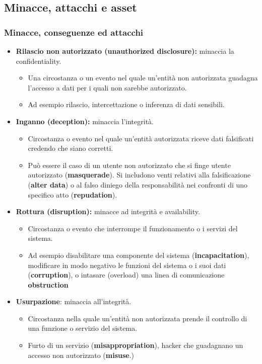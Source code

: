 \documentclass[12pt]{article}
\begin{document}
		\subsection{Minacce, attacchi e asset}
			\subsubsection{Minacce, conseguenze ed attacchi}
				\begin{itemize}
					\item \textbf{Rilascio non autorizzato (unauthorized disclosure):} minaccia la confidentiality.
					\begin{itemize}
						\item Una circostanza o un evento nel quale un'entità non autorizzata guadagna l'accesso a dati per i quali non sarebbe autorizzato.
						\item Ad esempio rilascio, intercettazione o inferenza di dati sensibili.
					\end{itemize}
					\item \textbf{Inganno (deception):} minaccia l'integrità.
					\begin{itemize}
						\item Circostanza o evento nel quale un'entità autorizzata riceve dati falsificati credendo che siano corretti.
						\item Può essere il caso di un utente non autorizzato che si finge utente autorizzato (\textbf{masquerade}). Si includono venti relativi alla falsificazione (\textbf{alter data}) o al falso diniego della responsabilità nei confronti di uno specifico atto (\textbf{repudation}).
					\end{itemize}
					\item \textbf{Rottura (disruption):} minacce ad integrità e availability.
					\begin{itemize}
						\item Circostanza o evento che interrompe il funzionamento o i servizi del sistema.
						\item Ad esempio disabilitare una componente del sistema (\textbf{incapacitation}), modificare in modo negativo le funzioni del sistema o i suoi dati (\textbf{corruption}), o intasare (overload) una linea di comunicazione \textbf{obstruction} 
					\end{itemize}
					\item \textbf{Usurpazione}: minaccia all'integrità.
					\begin{itemize}
						\item Circostanza nella quale un'entità non autorizzata prende il controllo di una funzione o servizio del sistema.
						\item Furto di un servizio (\textbf{misappropriation}), hacker che guadagnano un accesso non autorizzato (\textbf{misuse}.)
					\end{itemize}
				\end{itemize}
\end{document}

